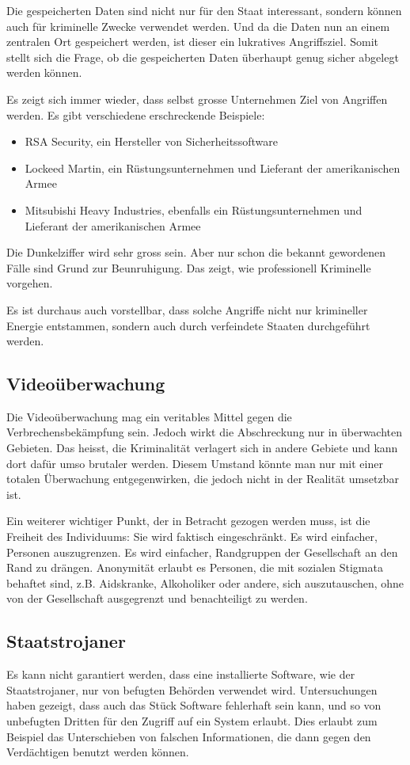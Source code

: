Die gespeicherten Daten sind nicht nur für den Staat interessant,
sondern können auch für kriminelle Zwecke verwendet werden.
Und da die Daten nun an einem zentralen Ort gespeichert werden, ist
dieser ein lukratives Angriffsziel.
Somit stellt sich die Frage, ob die gespeicherten Daten
überhaupt genug sicher abgelegt werden können.

Es zeigt sich immer wieder, dass selbst grosse Unternehmen Ziel von Angriffen
werden. Es gibt verschiedene erschreckende Beispiele:
\begin{itemize}
\item RSA Security, ein Hersteller von Sicherheitssoftware
\item Lockeed Martin, ein Rüstungsunternehmen und Lieferant der amerikanischen Armee
\item Mitsubishi Heavy Industries, ebenfalls ein Rüstungsunternehmen und
Lieferant der amerikanischen Armee
\end{itemize}

Die Dunkelziffer wird sehr gross sein. Aber nur schon die bekannt gewordenen
Fälle sind Grund zur Beunruhigung. Das zeigt, wie professionell
Kriminelle vorgehen.

Es ist durchaus auch vorstellbar, dass solche Angriffe nicht nur krimineller
Energie entstammen, sondern auch durch verfeindete Staaten durchgeführt werden.

\subsection{Videoüberwachung}
Die Videoüberwachung mag ein veritables Mittel gegen die Verbrechensbekämpfung sein.
Jedoch wirkt die Abschreckung nur in überwachten Gebieten.
Das heisst, die Kriminalität verlagert sich in andere Gebiete und
kann dort dafür umso brutaler werden.
Diesem Umstand könnte man nur mit einer totalen Überwachung entgegenwirken,
die jedoch nicht in der Realität umsetzbar ist.

Ein weiterer wichtiger Punkt, der in Betracht gezogen werden muss,
ist die Freiheit des Individuums: Sie wird faktisch eingeschränkt. 
Es wird einfacher, Personen auszugrenzen.
Es wird einfacher, Randgruppen der Gesellschaft an den Rand zu drängen.
Anonymität erlaubt es Personen, die mit sozialen Stigmata behaftet sind,
z.B. Aidskranke, Alkoholiker oder andere, sich auszutauschen, ohne von der
Gesellschaft ausgegrenzt und benachteiligt zu werden.

\subsection{Staatstrojaner}
Es kann nicht garantiert werden, dass eine installierte Software,
wie der Staatstrojaner, nur von befugten Behörden verwendet wird. 
Untersuchungen haben gezeigt, dass auch das Stück Software fehlerhaft 
sein kann, und so von unbefugten Dritten für den Zugriff auf ein System 
erlaubt. Dies erlaubt zum Beispiel das
Unterschieben von falschen Informationen, die dann gegen
den Verdächtigen benutzt werden können.


